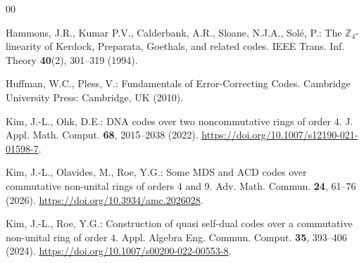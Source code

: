 \documentclass[12pt]{article}
\theoremstyle{definition}
\theoremstyle{plain}
\begin{document}
\begin{thebibliography}{00}



 Hammons, J.R., Kumar P.V., Calderbank, A.R., Sloane, N.J.A., Sol\'{e}, P.: The $\mathbb{Z}_4$-linearity of Kerdock, Preparata, Goethals, and related codes. IEEE Trans. Inf. Theory \textbf{40}(2), 301–319 (1994).


 Huffman, W.C., Pless, V.: Fundamentals of Error-Correcting Codes. Cambridge University Press: Cambridge, UK (2010).











 Kim, J.-L., Ohk, D.E.: DNA codes over two noncommutative rings of order 4. J. Appl. Math. Comput. \textbf{68}, 2015–2038 (2022). \href{https://doi.org/10.1007/s12190-021-01598-7}{https://doi.org/10.1007/s12190-021-01598-7}.


 Kim, J.-L., Olavides, M., Roe, Y.G.: Some MDS and ACD codes over commutative non-unital rings of orders 4 and 9. Adv. Math. Commun. \textbf{24}, 61--76 (2026). \href{https://doi.org/10.3934/amc.2026028}{https://doi.org/10.3934/amc.2026028}.


 Kim, J.-L., Roe, Y.G.: Construction of quasi self-dual codes over a commutative non-unital ring of order 4. Appl. Algebra Eng. Commun. Comput. \textbf{35}, 393–406 (2024). \href{https://doi.org/10.1007/s00200-022-00553-8}{https://doi.org/10.1007/s00200-022-00553-8}.



\end{thebibliography}
\end{document}
